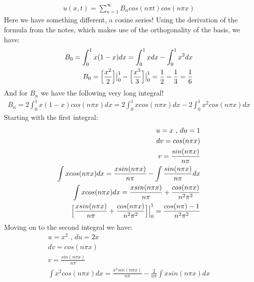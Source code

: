 \documentclass{article}
\begin{document}
\begin{equation}
\begin{aligned}
u(x,t) = \sum_{n=1}^{\infty}B_ncos(n\pi t)cos(n\pi x)
\end{aligned}
\end{equation}
Here we have something different, a cosine series! Using the derivation of the formula from the notes, which makes use of the orthogonality of the basis, we have:
\begin{equation}
\begin{aligned}
B_0 = \int_0^1x(1-x)dx = \int_0^1xdx - \int^1_0x^2dx\\
B_0 = \Big{[}\frac{x^2}{2} \Big{]}\big{|}_0^1 - \Big{[}\frac{x^3}{3} \Big{]}\big{|}_0^1 = \frac{1}{2} - \frac{1}{3} = \frac{1}{6}
\end{aligned}
\end{equation}
And for $B_n$ we have the following very long integral!
\begin{equation}
\begin{aligned}
B_n = 2\int_0^1x(1-x)cos(n\pi x)dx=2\int_0^1xcos(n\pi x)dx - 2\int_0^1x^2cos(n\pi x)dx
\end{aligned}
\end{equation}
Starting with the first integral:
\begin{equation}
\begin{aligned}
u = x \text{ , } du = 1\\
dv = cos(n\pi x)\\
v = \frac{sin(n\pi x)}{n\pi}\\
\int xcos(n\pi x)dx = \frac{xsin(n\pi x)}{n\pi} - \int\frac{sin(n\pi x)}{n\pi}dx\\
\int xcos(n\pi x)dx = \frac{xsin(n\pi x)}{n\pi} + \frac{cos(n\pi x)}{n^2\pi^2}\\
\Big{[} \frac{xsin(n\pi x)}{n\pi} + \frac{cos(n\pi x)}{n^2\pi^2} \Big{]}\Big{|}_0^1 = \frac{cos(n\pi) - 1}{n^2\pi^2}
\end{aligned}
\end{equation}
Moving on to the second integral we have:
\begin{equation}
\begin{aligned}
u = x^2 \text{ , } du = 2x\\
dv = cos(n\pi x)\\
v = \frac{sin(n\pi x)}{n\pi}\\
\int x^2cos(n\pi x)dx = \frac{x^2sin(n\pi x)}{n\pi} - \frac{2}{n\pi}\int xsin(n\pi x)dx
\end{aligned}
\end{equation}
\end{document}
